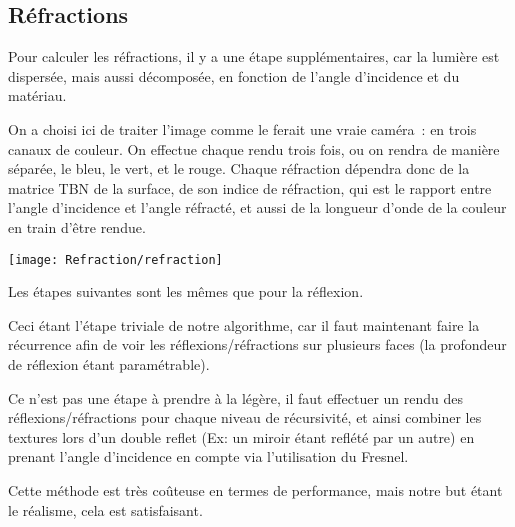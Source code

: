 \subsection{Réfractions}

Pour calculer les réfractions, il y a une étape supplémentaires, car la lumière est dispersée, mais aussi décomposée,
en fonction de l'angle d'incidence et du matériau.

On a choisi ici de traiter l'image comme le ferait une vraie caméra~:
en trois canaux de couleur.
On effectue chaque rendu trois fois, ou on rendra de manière séparée, le bleu,
le vert, et le rouge. Chaque réfraction dépendra donc de la matrice TBN de la
surface, de son indice de réfraction, qui est le rapport entre l'angle d'incidence
et l'angle réfracté, et aussi de la longueur d'onde de la couleur
en train d'être rendue.

\texttt{[image: Refraction/refraction]}

Les étapes suivantes sont les mêmes que pour la réflexion.

Ceci étant l'étape triviale de notre algorithme, car il faut maintenant faire la
récurrence afin de voir les réflexions/réfractions sur plusieurs faces (la profondeur
de réflexion étant paramétrable).

Ce n'est pas une étape à prendre à la légère, il faut effectuer un rendu des
réflexions/réfractions pour chaque niveau de récursivité, et ainsi combiner les
textures lors d'un double reflet (Ex: un miroir étant reflété par un autre) en
prenant l'angle d'incidence en compte via l'utilisation du Fresnel.

Cette méthode est très coûteuse en termes de performance,
mais notre but étant le réalisme, cela est satisfaisant.

